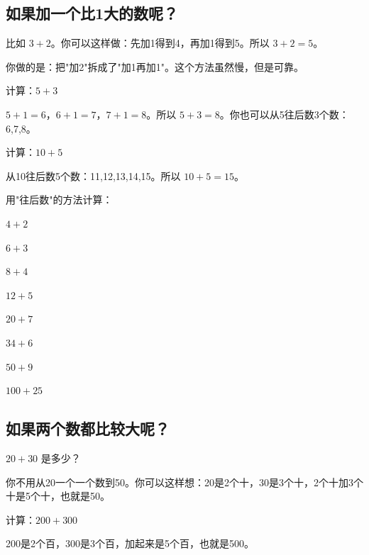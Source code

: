 \subsection*{如果加一个比1大的数呢？}

比如 $3+2$。你可以这样做：先加1得到4，再加1得到5。所以 $3+2=5$。

你做的是：把"加2"拆成了"加1再加1"。这个方法虽然慢，但是可靠。

\begin{example}
计算：$5+3$
\end{example}
\begin{solution}
$5+1=6$，$6+1=7$，$7+1=8$。所以 $5+3=8$。你也可以从5往后数3个数：6,7,8。
\end{solution}

\begin{example}
计算：$10+5$
\end{example}
\begin{solution}
从10往后数5个数：11,12,13,14,15。所以 $10+5=15$。
\end{solution}

\begin{exercise}
\item 用"往后数"的方法计算：
  \begin{subexercise}
    \item $4+2$
    \item $6+3$
    \item $8+4$
    \item $12+5$
    \item $20+7$
    \item $34+6$
    \item $50+9$
    \item $100+25$
  \end{subexercise}
\end{exercise}

\subsection*{如果两个数都比较大呢？}

$20+30$ 是多少？

你不用从20一个一个数到50。你可以这样想：20是2个十，30是3个十，2个十加3个十是5个十，也就是50。

\begin{example}
计算：$200+300$
\end{example}
\begin{solution}
200是2个百，300是3个百，加起来是5个百，也就是500。
\end{solution}

